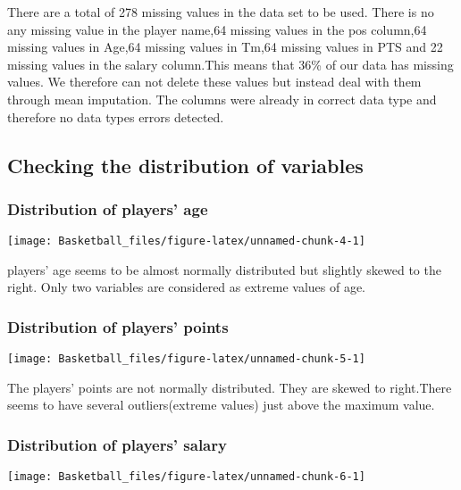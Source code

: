 \documentclass[
]{article}
\begin{document}
There are a total of 278 missing values in the data set to be used.
There is no any missing value in the player name,64 missing values in
the pos column,64 missing values in Age,64 missing values in Tm,64
missing values in PTS and 22 missing values in the salary column.This
means that 36\% of our data has missing values. We therefore can not
delete these values but instead deal with them through mean imputation.
The columns were already in correct data type and therefore no data
types errors detected.

\hypertarget{checking-the-distribution-of-variables}{%
\subsection{Checking the distribution of
variables}\label{checking-the-distribution-of-variables}}

\hypertarget{distribution-of-players-age}{%
\subsubsection{Distribution of players'
age}\label{distribution-of-players-age}}

\texttt{[image: Basketball\_files/figure-latex/unnamed-chunk-4-1]}

players' age seems to be almost normally distributed but slightly skewed
to the right. Only two variables are considered as extreme values of
age.

\hypertarget{distribution-of-players-points}{%
\subsubsection{Distribution of players'
points}\label{distribution-of-players-points}}

\texttt{[image: Basketball\_files/figure-latex/unnamed-chunk-5-1]}

The players' points are not normally distributed. They are skewed to
right.There seems to have several outliers(extreme values) just above
the maximum value.

\hypertarget{distribution-of-players-salary}{%
\subsubsection{Distribution of players'
salary}\label{distribution-of-players-salary}}

\texttt{[image: Basketball\_files/figure-latex/unnamed-chunk-6-1]}
\end{document}
